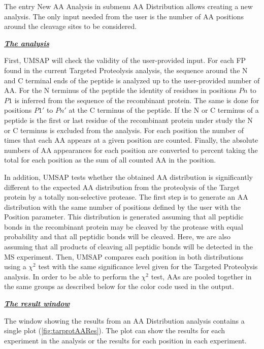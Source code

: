 The entry New AA Analysis in submenu AA Distribution allows creating a new analysis.
The only input needed from the user is the number of AA positions around the cleavage
sites to be considered.

\textit{\textbf{\underline{The analysis}}}

First, UMSAP will check the validity of the user-provided input. For each FP found
in the current Targeted Proteolysis analysis, the sequence around the N and C terminal
ends of the peptide is analyzed up to the user-provided number of AA. For the N terminus
of the peptide the identity of residues in positions \(Pn\) to \(P1\) is inferred
from the sequence of the recombinant protein. The same is done for positions \(P1'\)
to \(Pn'\) at the C terminus of the peptide. If the N or C terminus of a peptide is
the first or last residue of the recombinant protein under study the N or C terminus
is excluded from the analysis. For each position the number of times that each AA
appears at a given position are counted. Finally, the absolute numbers of AA appearances
for each position are converted to percent taking the total for each position as the
sum of all counted AA in the position.

In addition, UMSAP tests whether the obtained AA distribution is significantly different
to the expected AA distribution from the proteolysis of the Target protein by a
totally non-selective protease. The first step is to generate an AA distribution with
the same number of positions defined by the user with the Position parameter. This
distribution is generated assuming that all peptidic bonds in the recombinant protein
may be cleaved by the protease with equal probability and that all peptidic bonds
will be cleaved. Here, we are also assuming that all products of cleaving all peptidic
bonds will be detected in the MS experiment. Then, UMSAP compares each position in
both distributions using a $\chi^2$ test with the same significance level given for
the Targeted Proteolysis analysis. In order to be able to perform the $\chi^2$ test,
AAs are pooled together in the same groups as described below for the color code
used in the output.

\textit{\textbf{\underline{The result window}}} 

The window showing the results from an AA Distribution analysis contains a single
plot (\autoref{fig:tarprotAARes}). The plot can show the results for each experiment
in the analysis or the results for each position in each experiment. 

